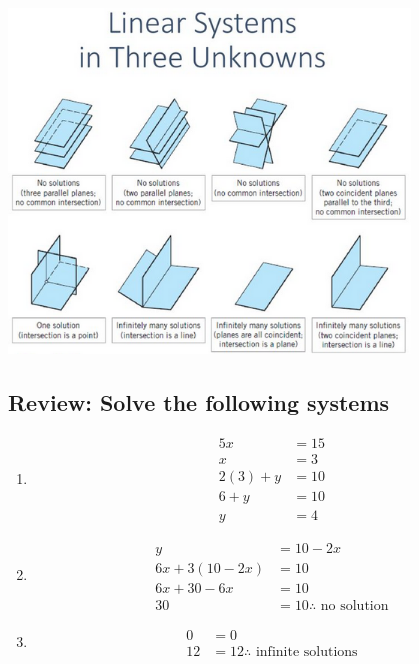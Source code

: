 \documentclass[
  letterpaper,
  DIV=11,
  numbers=noendperiod]{scrartcl}
\begin{document}
\begin{center}
\includegraphics[width=0.8\textwidth,height=\textheight]{img/linearsystems.png}
\end{center}

\subsection{Review: Solve the following
systems}\label{review-solve-the-following-systems}

\begin{enumerate}
\def\labelenumi{\arabic{enumi}.}
\item

  \begin{align*}
  5x &= 15 \\
  x &= 3 \\
  2(3)+y &= 10 \\
  6 + y &= 10 \\
  y &= 4
  \end{align*}
\item

  \begin{align*}
  y &= 10-2x \\
  6x + 3(10-2x) &= 10 \\
  6x + 30 - 6x &= 10 \\
  30 &= 10 \therefore \text { no solution}
  \end{align*}
\item

  \begin{align*}
  0 &= 0 \\
  12 &= 12 \therefore \text{ infinite solutions}
  \end{align*}
\end{enumerate}
\end{document}
